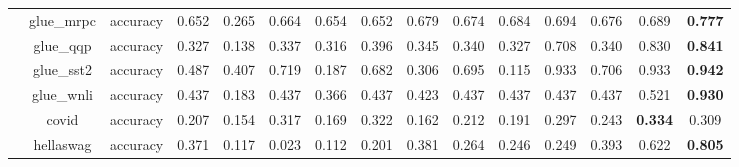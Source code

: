 \begin{landscape}
\begin{table}[ht]
{\begin{tabular}{ccccccccccccccc}
                                   & glue\_mrpc                     & accuracy                         & 0.652              & 0.265             & 0.664                      & 0.654             & 0.652                      & 0.679               & 0.674                    & 0.684               & 0.694                        & 0.676                   & 0.689                  & \textbf{0.777} \\
                                   & glue\_qqp                      & accuracy                         & 0.327              & 0.138             & 0.337                      & 0.316             & 0.396                      & 0.345               & 0.340                    & 0.327               & 0.708                        & 0.340                   & 0.830                  & \textbf{0.841} \\
                                   & glue\_sst2                     & accuracy                         & 0.487              & 0.407             & 0.719                      & 0.187             & 0.682                      & 0.306               & 0.695                    & 0.115               & 0.933                        & 0.706                   & 0.933                  & \textbf{0.942} \\
                                   & glue\_wnli                     & accuracy                         & 0.437              & 0.183             & 0.437                      & 0.366             & 0.437                      & 0.423               & 0.437                    & 0.437               & 0.437                        & 0.437                   & 0.521                  & \textbf{0.930} \\
                                   & covid                          & accuracy                         & 0.207              & 0.154             & 0.317                      & 0.169             & 0.322                      & 0.162               & 0.212                    & 0.191               & 0.297                        & 0.243                   & \textbf{0.334}         & 0.309          \\
                                   & hellaswag                      & accuracy                         & 0.371              & 0.117             & 0.023                      & 0.112             & 0.201                      & 0.381               & 0.264                    & 0.246               & 0.249                        & 0.393                   & 0.622                  & \textbf{0.805} \\

\end{tabular}}
\end{table}
\end{landscape}
